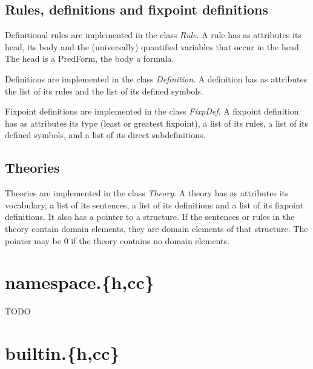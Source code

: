 \documentclass{article}
\begin{document}
\subsection*{Rules, definitions and fixpoint definitions}

Definitional rules are implemented in the class \emph{Rule}. A rule has as attributes its head, its body and the (universally) quantified variables that occur in the head. The head is a PredForm, the body a formula.

Definitions are implemented in the class \emph{Definition}. A definition has as attributes the list of its rules and the list of its defined symbols.

Fixpoint definitions are implemented in the class \emph{FixpDef}. A fixpoint definition has as attributes its type (least or greatest fixpoint), a list of its rules, a list of its defined symbols, and a list of its direct subdefinitions.

\subsection*{Theories}

Theories are implemented in the class \emph{Theory}. A theory has as attributes its vocabulary, a list of its sentences, a list of its definitions and a list of its fixpoint definitions. It also has a pointer to a structure. If the sentences or rules in the theory contain domain elements, they are domain elements of that structure. The pointer may be $0$ if the theory contains no domain elements.

\section{namespace.\{h,cc\}}

TODO

\section{builtin.\{h,cc\}}
\end{document}
